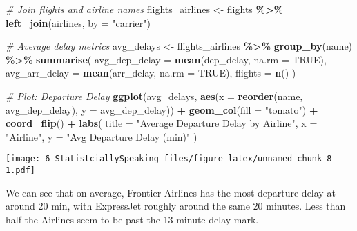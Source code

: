 \documentclass[
]{article}
\newenvironment{Shaded}{\begin{snugshade}}{\end{snugshade}}
\newcommand{\AttributeTok}[1]{\textcolor[rgb]{0.13,0.29,0.53}{#1}}
\newcommand{\CommentTok}[1]{\textcolor[rgb]{0.56,0.35,0.01}{\textit{#1}}}
\newcommand{\ConstantTok}[1]{\textcolor[rgb]{0.56,0.35,0.01}{#1}}
\newcommand{\FunctionTok}[1]{\textcolor[rgb]{0.13,0.29,0.53}{\textbf{#1}}}
\newcommand{\NormalTok}[1]{#1}
\newcommand{\OtherTok}[1]{\textcolor[rgb]{0.56,0.35,0.01}{#1}}
\newcommand{\SpecialCharTok}[1]{\textcolor[rgb]{0.81,0.36,0.00}{\textbf{#1}}}
\newcommand{\StringTok}[1]{\textcolor[rgb]{0.31,0.60,0.02}{#1}}
\begin{document}
\begin{Shaded}
\begin{Highlighting}[]
\CommentTok{\# Join flights and airline names}
\NormalTok{flights\_airlines }\OtherTok{\textless{}{-}}\NormalTok{ flights }\SpecialCharTok{\%\textgreater{}\%}
  \FunctionTok{left\_join}\NormalTok{(airlines, }\AttributeTok{by =} \StringTok{"carrier"}\NormalTok{)}

\CommentTok{\# Average delay metrics}
\NormalTok{avg\_delays }\OtherTok{\textless{}{-}}\NormalTok{ flights\_airlines }\SpecialCharTok{\%\textgreater{}\%}
  \FunctionTok{group\_by}\NormalTok{(name) }\SpecialCharTok{\%\textgreater{}\%}
  \FunctionTok{summarise}\NormalTok{(}
    \AttributeTok{avg\_dep\_delay =} \FunctionTok{mean}\NormalTok{(dep\_delay, }\AttributeTok{na.rm =} \ConstantTok{TRUE}\NormalTok{),}
    \AttributeTok{avg\_arr\_delay =} \FunctionTok{mean}\NormalTok{(arr\_delay, }\AttributeTok{na.rm =} \ConstantTok{TRUE}\NormalTok{),}
    \AttributeTok{flights =} \FunctionTok{n}\NormalTok{()}
\NormalTok{  )}

\CommentTok{\# Plot: Departure Delay}
\FunctionTok{ggplot}\NormalTok{(avg\_delays, }\FunctionTok{aes}\NormalTok{(}\AttributeTok{x =} \FunctionTok{reorder}\NormalTok{(name, avg\_dep\_delay), }\AttributeTok{y =}\NormalTok{ avg\_dep\_delay)) }\SpecialCharTok{+}
  \FunctionTok{geom\_col}\NormalTok{(}\AttributeTok{fill =} \StringTok{"tomato"}\NormalTok{) }\SpecialCharTok{+}
  \FunctionTok{coord\_flip}\NormalTok{() }\SpecialCharTok{+}
  \FunctionTok{labs}\NormalTok{(}
    \AttributeTok{title =} \StringTok{"Average Departure Delay by Airline"}\NormalTok{,}
    \AttributeTok{x =} \StringTok{"Airline"}\NormalTok{,}
    \AttributeTok{y =} \StringTok{"Avg Departure Delay (min)"}
\NormalTok{  )}
\end{Highlighting}
\end{Shaded}

\texttt{[image: 6-StatistciallySpeaking\_files/figure-latex/unnamed-chunk-8-1.pdf]}

We can see that on average, Frontier Airlines has the most departure
delay at around 20 min, with ExpressJet roughly around the same 20
minutes. Less than half the Airlines seem to be past the 13 minute delay
mark.
\end{document}
